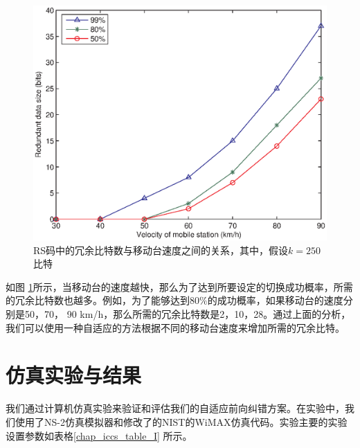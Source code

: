 \begin{figure}[htbp]
\begin{centering}
\includegraphics[scale=0.7]{iccs_speed_size_theory}
\caption{RS码中的冗余比特数与移动台速度之间的关系，其中，假设$k=250$比特}
\label{fig:chap_iccs_handover_algorithm_AFEC_bits}
\end{centering}
\end{figure}

如图 \ref{fig:chap_iccs_handover_algorithm_AFEC_bits}所示，当移动台的速度越快，那么为了达到所要设定的切换成功概率，所需的冗余比特数也越多。例如，为了能够达到$80\%$的成功概率，如果移动台的速度分别是50，70， 90 km/h，那么所需的冗余比特数是2，10，28。通过上面的分析，我们可以使用一种自适应的方法根据不同的移动台速度来增加所需的冗余比特。

\section{仿真实验与结果}
我们通过计算机仿真实验来验证和评估我们的自适应前向纠错方案。在实验中，我们使用了NS-2仿真模拟器和修改了的NIST的WiMAX仿真代码。实验主要的实验设置参数如表格\ref{chap_iccs_table_I} 所示。

